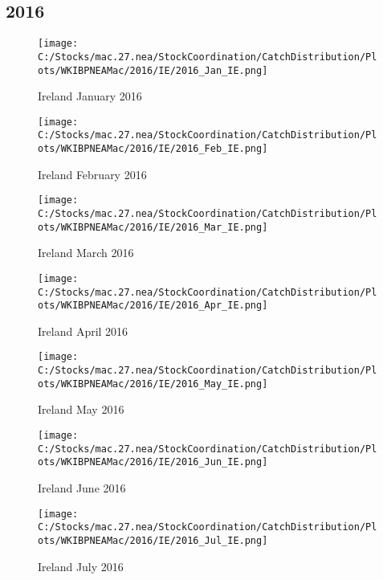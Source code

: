 \documentclass{article}
\begin{document}
\subsection{2016}



\begin{figure}[h]
	\centering
		\texttt{[image: C:/Stocks/mac.27.nea/StockCoordination/CatchDistribution/Plots/WKIBPNEAMac/2016/IE/2016\_Jan\_IE.png]}
	\caption{Ireland January 2016}
	\label{fig:2016_Jan_IE}
\end{figure}

\begin{figure}
	\centering
		\texttt{[image: C:/Stocks/mac.27.nea/StockCoordination/CatchDistribution/Plots/WKIBPNEAMac/2016/IE/2016\_Feb\_IE.png]}
	\caption{Ireland February 2016}
	\label{fig:2016_Feb_IE}
\end{figure}

\begin{figure}
	\centering
		\texttt{[image: C:/Stocks/mac.27.nea/StockCoordination/CatchDistribution/Plots/WKIBPNEAMac/2016/IE/2016\_Mar\_IE.png]}
	\caption{Ireland March 2016}
	\label{fig:2016_Mar_IE}
\end{figure}

\begin{figure}
	\centering
		\texttt{[image: C:/Stocks/mac.27.nea/StockCoordination/CatchDistribution/Plots/WKIBPNEAMac/2016/IE/2016\_Apr\_IE.png]}
	\caption{Ireland April 2016}
	\label{fig:2016_Apr_IE}
\end{figure}

\begin{figure}
	\centering
		\texttt{[image: C:/Stocks/mac.27.nea/StockCoordination/CatchDistribution/Plots/WKIBPNEAMac/2016/IE/2016\_May\_IE.png]}
	\caption{Ireland May 2016}
	\label{fig:2016_May_IE}
\end{figure}

\begin{figure}
	\centering
		\texttt{[image: C:/Stocks/mac.27.nea/StockCoordination/CatchDistribution/Plots/WKIBPNEAMac/2016/IE/2016\_Jun\_IE.png]}
	\caption{Ireland June 2016}
	\label{fig:2016_Jun_IE}
\end{figure}

\begin{figure}
	\centering
		\texttt{[image: C:/Stocks/mac.27.nea/StockCoordination/CatchDistribution/Plots/WKIBPNEAMac/2016/IE/2016\_Jul\_IE.png]}
	\caption{Ireland July 2016}
	\label{fig:2016_Jul_IE}
\end{figure}
\end{document}
